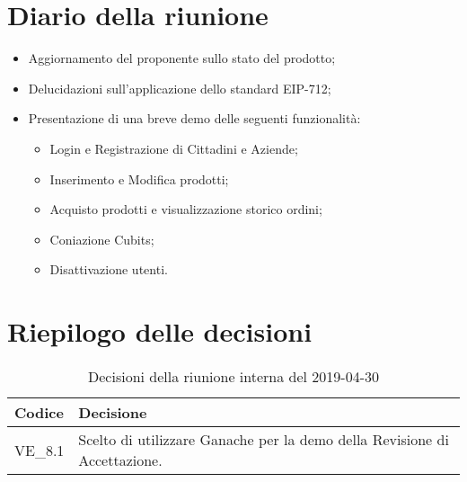 \section{Diario della riunione}
\begin{itemize}
	\item Aggiornamento del proponente sullo stato del prodotto;
	\item Delucidazioni sull'applicazione dello standard EIP-712;
	\item Presentazione di una breve demo delle seguenti funzionalità:
	\begin{itemize}
		\item Login e Registrazione di Cittadini e Aziende;
		\item Inserimento e Modifica prodotti;
		\item Acquisto prodotti e visualizzazione storico ordini;
		\item Coniazione Cubits;
		\item Disattivazione utenti.
	\end{itemize}
\end{itemize}

\hspace{3cm}

\section{Riepilogo delle decisioni}

	
	\begin{longtable}{ >{\centering}p{} >{}p{}}
		\caption{Decisioni della riunione interna del 2019-04-30}\\	
		\rowcolorhead
		\textbf{\color{white}Codice} 
		& \centering\textbf{\color{white}Decisione} 
		\tabularnewline 
		\endfirsthead
		VE\_8.1 & Scelto di utilizzare Ganache per la demo della Revisione di 
		Accettazione.
		
		
	\end{longtable}
	




